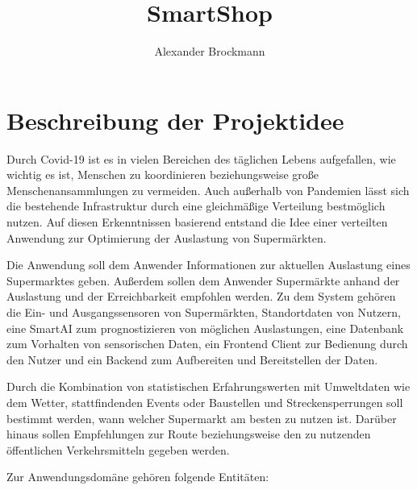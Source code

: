 \documentclass[runningheads]{llncs}
\begin{document}
%
\title{SmartShop}
%
%
\author{Alexander Brockmann}
%
%


%
\maketitle              %

\section{Beschreibung der Projektidee}
Durch Covid-19 ist es in vielen Bereichen des täglichen Lebens aufgefallen, wie wichtig es ist, Menschen zu koordinieren beziehungsweise große Menschenansammlungen zu vermeiden.
Auch außerhalb von Pandemien lässt sich die bestehende Infrastruktur durch eine gleichmäßige Verteilung bestmöglich nutzen.
Auf diesen Erkenntnissen basierend entstand die Idee einer verteilten Anwendung zur Optimierung der Auslastung von Supermärkten.

Die Anwendung soll dem Anwender Informationen zur aktuellen Auslastung eines Supermarktes geben.
Außerdem sollen dem Anwender Supermärkte anhand der Auslastung und der Erreichbarkeit empfohlen werden.
Zu dem System gehören die Ein- und Ausgangssensoren von Supermärkten, Standortdaten von Nutzern, eine SmartAI zum prognostizieren von möglichen Auslastungen, eine Datenbank zum Vorhalten von sensorischen Daten, ein Frontend Client zur Bedienung durch den Nutzer und ein Backend zum Aufbereiten und Bereitstellen der Daten.

Durch die Kombination von statistischen Erfahrungswerten mit Umweltdaten wie dem Wetter, stattfindenden Events oder Baustellen und Streckensperrungen soll bestimmt werden, wann welcher Supermarkt am besten zu nutzen ist.
Darüber hinaus sollen Empfehlungen zur Route beziehungsweise den zu nutzenden öffentlichen Verkehrsmitteln gegeben werden.

Zur Anwendungsdomäne gehören folgende Entitäten:
\end{document}
